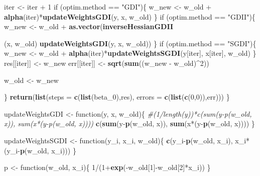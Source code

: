 \documentclass[]{article}
\newenvironment{Shaded}{\begin{snugshade}}{\end{snugshade}}
\newcommand{\KeywordTok}[1]{\textcolor[rgb]{0.13,0.29,0.53}{\textbf{{#1}}}}
\newcommand{\DataTypeTok}[1]{\textcolor[rgb]{0.13,0.29,0.53}{{#1}}}
\newcommand{\DecValTok}[1]{\textcolor[rgb]{0.00,0.00,0.81}{{#1}}}
\newcommand{\StringTok}[1]{\textcolor[rgb]{0.31,0.60,0.02}{{#1}}}
\newcommand{\CommentTok}[1]{\textcolor[rgb]{0.56,0.35,0.01}{\textit{{#1}}}}
\newcommand{\NormalTok}[1]{{#1}}
\begin{document}
\begin{Shaded}
\begin{Highlighting}[]
{    \NormalTok{iter <-}\StringTok{ }\NormalTok{iter +}\StringTok{ }\DecValTok{1}
    \NormalTok{if (optim.method ==}\StringTok{ "GDI"}\NormalTok{)\{}
      \NormalTok{w_new <-}\StringTok{ }\NormalTok{w_old +}\StringTok{ }\KeywordTok{alpha}\NormalTok{(iter)*}\KeywordTok{updateWeightsGDI}\NormalTok{(y, x, w_old)}
    \NormalTok{\}}
    \NormalTok{if (optim.method ==}\StringTok{ "GDII"}\NormalTok{)\{}
      \NormalTok{w_new <-}\StringTok{ }\NormalTok{w_old +}\StringTok{ }\KeywordTok{as.vector}\NormalTok{(}\KeywordTok{inverseHessianGDII}\NormalTok{(x, w_old)%*%}
\StringTok{                                   }\KeywordTok{updateWeightsGDI}\NormalTok{(y, x, w_old))}
    \NormalTok{\}}
    \NormalTok{if (optim.method ==}\StringTok{ "SGDI"}\NormalTok{)\{}
      \NormalTok{w_new <-}\StringTok{ }\NormalTok{w_old +}\StringTok{ }\KeywordTok{alpha}\NormalTok{(iter)*}\KeywordTok{updateWeightsSGDI}\NormalTok{(y[iter], x[iter], w_old)}
    \NormalTok{\}}
    \NormalTok{res[[iter]] <-}\StringTok{ }\NormalTok{w_new}
    \NormalTok{err[[iter]] <-}\StringTok{ }\KeywordTok{sqrt}\NormalTok{(}\KeywordTok{sum}\NormalTok{((w_new -}\StringTok{ }\NormalTok{w_old)^}\DecValTok{2}\NormalTok{))}

    \NormalTok{w_old <-}\StringTok{ }\NormalTok{w_new}

  \NormalTok{\}}
  \KeywordTok{return}\NormalTok{(}\KeywordTok{list}\NormalTok{(}\DataTypeTok{steps =} \KeywordTok{c}\NormalTok{(}\KeywordTok{list}\NormalTok{(beta_0),res), }\DataTypeTok{errors =} \KeywordTok{c}\NormalTok{(}\KeywordTok{list}\NormalTok{(}\KeywordTok{c}\NormalTok{(}\DecValTok{0}\NormalTok{,}\DecValTok{0}\NormalTok{)),err)))}
\NormalTok{\}}

\NormalTok{updateWeightsGDI <-}\StringTok{ }\NormalTok{function(y, x, w_old)\{}
  \CommentTok{#(1/length(y))*c(sum(y-p(w_old, x)), sum(x*(y-p(w_old, x))))}
  \KeywordTok{c}\NormalTok{(}\KeywordTok{sum}\NormalTok{(y-}\KeywordTok{p}\NormalTok{(w_old, x)), }\KeywordTok{sum}\NormalTok{(x*(y-}\KeywordTok{p}\NormalTok{(w_old, x))))}
\NormalTok{\}}

\NormalTok{updateWeightsSGDI <-}\StringTok{ }\NormalTok{function(y_i, x_i, w_old)\{}
  \KeywordTok{c}\NormalTok{(y_i-}\KeywordTok{p}\NormalTok{(w_old, x_i), x_i*(y_i-}\KeywordTok{p}\NormalTok{(w_old, x_i)))}
\NormalTok{\}}

\NormalTok{p <-}\StringTok{ }\NormalTok{function(w_old, x_i)\{}
  \DecValTok{1}\NormalTok{/(}\DecValTok{1}\NormalTok{+}\KeywordTok{exp}\NormalTok{(-w_old[}\DecValTok{1}\NormalTok{]-w_old[}\DecValTok{2}\NormalTok{]*x_i))}
\NormalTok{\}}

}}
\end{Highlighting}
\end{Shaded}
\end{document}
